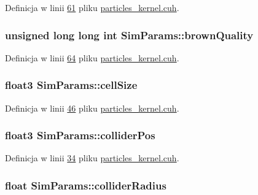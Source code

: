 Definicja w linii \hyperlink{particles__kernel_8cuh_source_l00061}{61} pliku \hyperlink{particles__kernel_8cuh_source}{particles\-\_\-kernel.\-cuh}.

\hypertarget{struct_sim_params_a366145dd58e2e7eacebffcbe78dd89ff}{
\subsubsection[{brown\-Quality}]{\setlength{\rightskip}{0pt plus 5cm}unsigned long long int Sim\-Params\-::brown\-Quality}}\label{struct_sim_params_a366145dd58e2e7eacebffcbe78dd89ff}


Definicja w linii \hyperlink{particles__kernel_8cuh_source_l00064}{64} pliku \hyperlink{particles__kernel_8cuh_source}{particles\-\_\-kernel.\-cuh}.

\hypertarget{struct_sim_params_ad5d71ad4ba6acc829a35f47b3da3e169}{
\subsubsection[{cell\-Size}]{\setlength{\rightskip}{0pt plus 5cm}float3 Sim\-Params\-::cell\-Size}}\label{struct_sim_params_ad5d71ad4ba6acc829a35f47b3da3e169}


Definicja w linii \hyperlink{particles__kernel_8cuh_source_l00046}{46} pliku \hyperlink{particles__kernel_8cuh_source}{particles\-\_\-kernel.\-cuh}.

\hypertarget{struct_sim_params_aa27be265020f137f0a9cfbc3f1d2d9f8}{
\subsubsection[{collider\-Pos}]{\setlength{\rightskip}{0pt plus 5cm}float3 Sim\-Params\-::collider\-Pos}}\label{struct_sim_params_aa27be265020f137f0a9cfbc3f1d2d9f8}


Definicja w linii \hyperlink{particles__kernel_8cuh_source_l00034}{34} pliku \hyperlink{particles__kernel_8cuh_source}{particles\-\_\-kernel.\-cuh}.

\hypertarget{struct_sim_params_a06ca2162f6f0aec08343db6ed8cd4478}{
\subsubsection[{collider\-Radius}]{\setlength{\rightskip}{0pt plus 5cm}float Sim\-Params\-::collider\-Radius}}\label{struct_sim_params_a06ca2162f6f0aec08343db6ed8cd4478}


